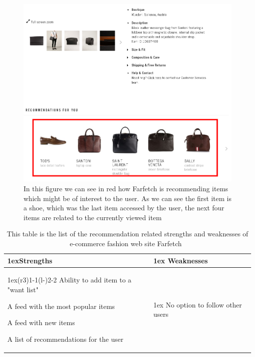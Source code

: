 \begin{figure}[H]
    \centering
    \includegraphics[width=5in]{image/farfetchedRecommendationExample.png}
    \caption[Example of Farfetch's recommendations]{In this figure we can see in red how Farfetch is recommending items which might be of interest to the user. As we can see the first item is a shoe, which was the last item accessed by the user, the next four items are related to the currently viewed item}
    \label{figure:farfetchedRecommendationExample}
\end{figure}
\begin{table}[H]
    \centering
    \begin{tabularx}{\linewidth}{>{\parskip1ex}X@{\kern4\tabcolsep}>{\parskip1ex}X}
      \toprule
      \hfil\bfseries Strengths
      &
      \hfil\bfseries Weaknesses
        \\\cmidrule(r{3\tabcolsep}){1-1}\cmidrule(l{-\tabcolsep}){2-2}
            Ability to add item to a "want list" \par
            A feed with the most popular items \par
            A feed with new items \par
            A list of recommendations for the user \par
          &
            No option to follow other users \par
         \\\bottomrule
    \end{tabularx}
    \caption[Recommendation related strengths and weaknesses of Farfetch~\cite{Farfetch}]{This table is the list of the recommendation related strengths and weaknesses of e-commerce fashion web site Farfetch~\cite{Farfetch}}
    \label{table:ecommenreceFarfetch}
\end{table}

